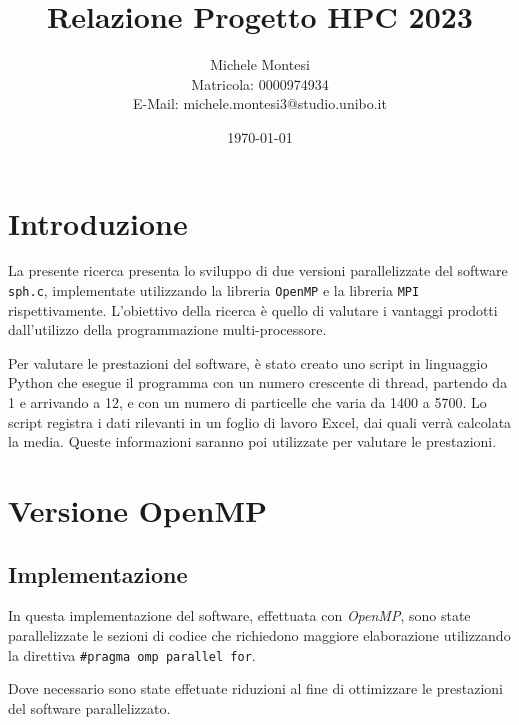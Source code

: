 \documentclass[a4paper, 12pt]{report}
\title{Relazione Progetto HPC 2023}
\author{Michele Montesi \\
        Matricola: 0000974934 \\
        E-Mail: michele.montesi3@studio.unibo.it}
\date{\today}
\begin{document}
\maketitle

\chapter*{Introduzione}
\begin{sloppypar}
La presente ricerca presenta lo sviluppo di due versioni parallelizzate del software \texttt{sph.c}, 
implementate utilizzando la libreria \texttt{OpenMP} e la libreria \texttt{MPI} rispettivamente. 
L'obiettivo della ricerca è quello di valutare i vantaggi prodotti dall'utilizzo della programmazione multi-processore.
\end{sloppypar}

\bigskip

\begin{sloppypar}
\noindent
Per valutare le prestazioni del software, è stato creato uno script in linguaggio Python che esegue il programma 
con un numero crescente di thread, partendo da 1 e arrivando a 12, e con un numero di particelle che varia da 1400 
a 5700. Lo script registra i dati rilevanti in un foglio di lavoro Excel, dai quali verrà calcolata la media.
Queste informazioni saranno poi utilizzate per valutare le prestazioni.

\end{sloppypar}

{\let\clearpage\relax\chapter*{Versione OpenMP}}
\section*{Implementazione}
\begin{sloppypar}
  \noindent
  In questa implementazione del software, effettuata con \textit{OpenMP}, sono state parallelizzate le sezioni di codice
  che richiedono maggiore elaborazione utilizzando la direttiva \texttt{\#pragma omp parallel for}.

  \smallskip
  \noindent
  Dove necessario sono state effetuate riduzioni al fine di ottimizzare le prestazioni del software parallelizzato.
\end{sloppypar}
\end{document}
